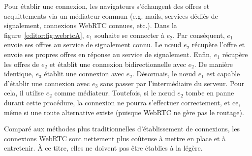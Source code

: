 \noindent Pour établir une connexion, les navigateurs s'échangent des offres et
acquittements via un médiateur commun (e.g. mails, services dédiés de
signalement, connexions WebRTC connues, etc.). Dans la figure~\ref{editor:fig:webrtcA},
$e_1$ souhaite se connecter à $e_2$. Par conséquent, $e_1$ envoie ses offres au
service de signalement connu. Le nœud $e_2$ récupère l'offre et envoie ses
propres offres en réponse au service de signalement. Enfin, $e_1$ récupère les
offres de $e_2$ et établit une connexion bidirectionnelle avec $e_2$. De manière
identique, $e_3$ établit une connexion avec $e_2$. Désormais, le nœud $e_1$ est
capable d'établir une connexion avec $e_3$ sans passer par l'intermédiaire du
serveur. Pour cela, il utilise $e_2$ comme médiateur. Toutefois, si le nœud
$e_2$ tombe en panne durant cette procédure, la connexion ne pourra s'effectuer
correctement, et ce, même si une route alternative existe (puisque WebRTC ne
gère pas le routage).

\noindent Comparé aux méthodes plus traditionnelles d'établissement de
connexions, les connexions WebRTC sont nettement plus coûteuse à mettre en place
et à entretenir. À ce titre, elles ne doivent pas être établies à la légère.
 




